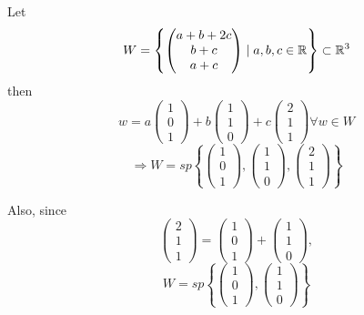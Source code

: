 \documentclass[a4paper,10pt]{article}
\begin{document}
\begin{ex}
	Let
	\[
		W = \left\{
			\begin{pmatrix}
				a + b + 2c \\
				b + c \\
				a + c
			\end{pmatrix}
			\mid a,b,c \in \mathbb{R}
		\right\}
		\subset \mathbb{R}^3
	\]
	then
	\[
		w = a
		\begin{pmatrix}
			1 \\
			0 \\
			1
		\end{pmatrix}
		+ b
		\begin{pmatrix}
			1 \\
			1 \\
			0
		\end{pmatrix}
		+ c
		\begin{pmatrix}
			2 \\
			1 \\
			1
		\end{pmatrix}
		\forall w \in W
	\]
	\[
		\Rightarrow W = sp\left\{
			\begin{pmatrix}
				1 \\
				0 \\
				1
			\end{pmatrix}
			,
			\begin{pmatrix}
				1 \\
				1 \\
				0
			\end{pmatrix}
			,
			\begin{pmatrix}
				2 \\
				1 \\
				1
			\end{pmatrix}
		\right\}
	\]

	Also, since
	\[
		\begin{pmatrix}
			2 \\
			1 \\
			1
		\end{pmatrix}
		=
		\begin{pmatrix}
			1 \\
			0 \\
			1
		\end{pmatrix}
		+
		\begin{pmatrix}
			1 \\
			1 \\
			0
		\end{pmatrix},
	\]
	\[
		W = sp\left\{
			\begin{pmatrix}
				1 \\
				0 \\
				1
			\end{pmatrix}
			,
			\begin{pmatrix}
				1 \\
				1 \\
				0
			\end{pmatrix}
		\right\}
	\]
\end{ex}
\end{document}
